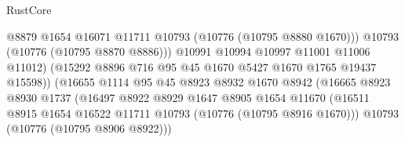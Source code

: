 \begin{lexlean}{RustCore}
\begin{coremodule}
                                            @8879
                                            @1654
                                            @16071
                                            @11711
                                            @10793
                                            (@10776 (@10795 @8880 @1670)))
                                          @10793
                                          (@10776 (@10795 @8870 @8886)))
                                        @10991
                                        @10994
                                        @10997
                                        @11001
                                        @11006
                                        @11012)
                                      (@15292
                                        @8896
                                        @716
                                        @95
                                        @45
                                        @1670
                                        @5427
                                        @1670
                                        @1765
                                        @19437
                                        @15598))
                                    (@16655
                                      @1114
                                      @95
                                      @45
                                      @8923
                                      @8932
                                      @1670
                                      @8942
                                      (@16665
                                        @8923
                                        @8930
                                        @1737
                                        (@16497
                                          @8922
                                          @8929
                                          @1647
                                          @8905
                                          @1654
                                          @11670
                                          (@16511
                                            @8915
                                            @1654
                                            @16522
                                            @11711
                                            @10793
                                            (@10776 (@10795 @8916 @1670)))
                                          @10793
                                          (@10776 (@10795 @8906 @8922)))

\end{coremodule}
\end{lexlean}
